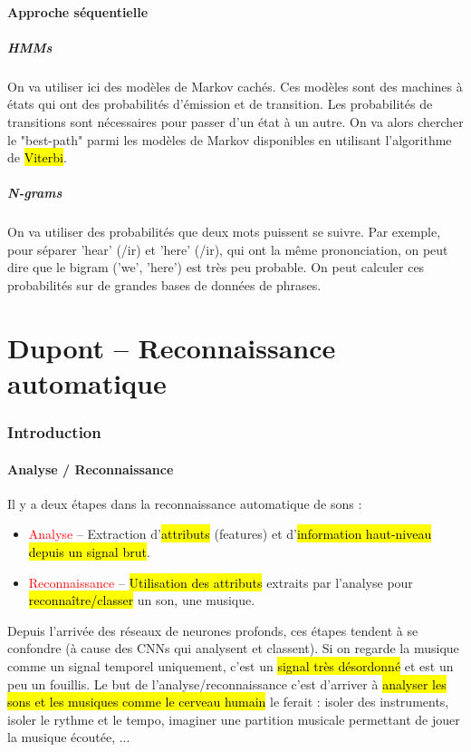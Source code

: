 \documentclass[letterpaper, 12pt]{article}
\newcommand{\alinea}{
\hspace*{0.5cm}}
\newcommand{\red}[1]{
	\textcolor{red}{#1}}
\begin{document}
		\subsection{Approche séquentielle}
			\subsubsection*{HMMs}
				\alinea On va utiliser ici des modèles de Markov cachés. Ces modèles sont des machines à états qui ont des probabilités
					d'émission et de transition. Les probabilités de transitions sont nécessaires pour passer d'un état à un autre.
					On va alors chercher le "best-path" parmi les modèles de Markov disponibles en utilisant l'algorithme de \hl{Viterbi}.
			\subsubsection*{N-grams}
				\alinea On va utiliser des probabilités que deux mots puissent se suivre. Par exemple, pour séparer 'hear' (/ir) et 'here'
					(/ir), qui ont la même prononciation, on peut dire que le bigram ('we', 'here') est très peu probable. 
					On peut calculer ces probabilités sur de grandes bases de données de phrases.
%
\pagebreak
%
\part{Dupont -- Reconnaissance automatique}
	\section{Introduction}
		\subsection{Analyse / Reconnaissance}
			\alinea Il y a deux étapes dans la reconnaissance automatique de sons : 
			\begin{itemize}
				\setlength\itemsep{0cm}
				\item \red{Analyse} -- Extraction d'\hl{attributs} (features) et d'\hl{information haut-niveau depuis un signal brut}.
				\item \red{Reconnaissance} -- \hl{Utilisation des attributs} extraits par l'analyse pour \hl{reconnaître/classer} un son, 
					une musique.
			\end{itemize}
			\alinea Depuis l'arrivée des réseaux de neurones profonds, ces étapes tendent à se confondre (à cause des CNNs qui analysent
				et classent). Si on regarde la musique comme un signal temporel uniquement, c'est un \hl{signal très désordonné} et est 
				un peu un fouillis. Le but de l'analyse/reconnaissance c'est d'arriver à \hl{analyser les sons et les musiques comme 
				le cerveau humain} le ferait : isoler des instruments, isoler le rythme et le tempo, imaginer une partition musicale
				permettant de jouer la musique écoutée, ...
\end{document}
